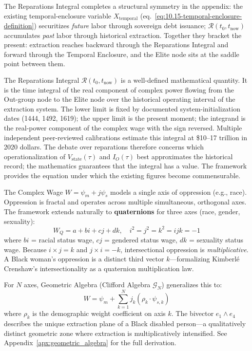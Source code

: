 The Reparations Integral completes a structural symmetry in the
appendix: the existing temporal-enclosure variable
$X_{\text{temporal}}$
(eq.~\ref{eq:10.15-temporal-enclosure-definition})
securitizes \emph{future} labor through sovereign debt issuance;
$\mathcal{R}(t_0, t_{\text{now}})$ accumulates \emph{past} labor
through historical extraction. Together they bracket the present:
extraction reaches backward through the Reparations Integral and
forward through the Temporal Enclosure, and the Elite node sits at
the saddle point between them.

\begin{keyinsight}
The Reparations Integral $\mathcal{R}(t_0, t_{\text{now}})$ is a
well-defined mathematical quantity. It is
the time integral of the real component of complex power flowing from
the Out-group node to the Elite node over the historical operating
interval of the extraction system. The lower limit is fixed by
documented system-initialization dates (1444, 1492, 1619); the upper
limit is the present moment; the integrand is the real-power
component of the complex wage with the sign reversed. Multiple
independent peer-reviewed calibrations
\cite{craemer2015slavery, darity_mullen, coates_case_for_reparations}
estimate this integral at \$10--17 trillion in 2020 dollars. The
debate over reparations therefore concerns which operationalization
of $V_{\text{state}}(\tau)$ and $I_O(\tau)$ best approximates the
historical record; the mathematics guarantees that the integral has a
value. The framework provides the equation under which the existing figures become commensurable.
\end{keyinsight}

\begin{keyinsight}
The Complex Wage $W = \psi_m + j\psi_s$ models a single axis of oppression (e.g., race). Oppression is fractal and operates across multiple simultaneous, orthogonal axes. The framework extends naturally to \textbf{quaternions} for three axes (race, gender, sexuality):
\[
W_Q = a + bi + cj + dk, \quad i^2 = j^2 = k^2 = ijk = -1
\]
where $bi$ = racial status wage, $cj$ = gendered status wage, $dk$ = sexuality status wage. Because $i \times j = k$ and $j \times i = -k$, intersectional oppression is \emph{multiplicative}. A Black woman's oppression is a distinct third vector $k$---formalizing Kimberl\'e Crenshaw's intersectionality as a quaternion multiplication law.

For $N$ axes, Geometric Algebra (Clifford Algebra $\mathcal{G}_N$) generalizes this to:
\begin{equation}\label{eq:0.ga-ndim}
W = \psi_m + \sum_{k=1}^{N} j_k \left(\rho_k \cdot \psi_{s,k}\right)
\end{equation}
where $\rho_k$ is the demographic weight coefficient on axis $k$. The bivector $e_1 \wedge e_4$ describes the unique extraction plane of a Black disabled person---a qualitatively distinct geometric zone where extraction is multiplicatively intensified. See Appendix~\ref{apx:geometric_algebra} for the full derivation.
\end{keyinsight}

